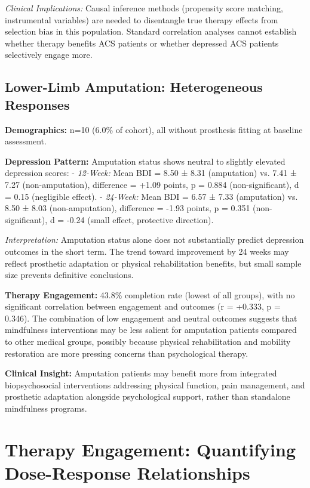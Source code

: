 \documentclass[conference]{IEEEtran}
\begin{document}
\textit{Clinical Implications:} Causal inference methods (propensity score matching, instrumental variables) are needed to disentangle true therapy effects from selection bias in this population. Standard correlation analyses cannot establish whether therapy benefits ACS patients or whether depressed ACS patients selectively engage more.

\subsection{Lower-Limb Amputation: Heterogeneous Responses}

\textbf{Demographics:} n=10 (6.0\% of cohort), all without prosthesis fitting at baseline assessment.

\textbf{Depression Pattern:} Amputation status shows neutral to slightly elevated depression scores:
- \textit{12-Week:} Mean BDI = 8.50 ± 8.31 (amputation) vs. 7.41 ± 7.27 (non-amputation), difference = +1.09 points, p = 0.884 (non-significant), d = 0.15 (negligible effect).
- \textit{24-Week:} Mean BDI = 6.57 ± 7.33 (amputation) vs. 8.50 ± 8.03 (non-amputation), difference = -1.93 points, p = 0.351 (non-significant), d = -0.24 (small effect, protective direction).

\textit{Interpretation:} Amputation status alone does not substantially predict depression outcomes in the short term. The trend toward improvement by 24 weeks may reflect prosthetic adaptation or physical rehabilitation benefits, but small sample size prevents definitive conclusions.

\textbf{Therapy Engagement:} 43.8\% completion rate (lowest of all groups), with no significant correlation between engagement and outcomes (r = +0.333, p = 0.346). The combination of low engagement and neutral outcomes suggests that mindfulness interventions may be less salient for amputation patients compared to other medical groups, possibly because physical rehabilitation and mobility restoration are more pressing concerns than psychological therapy.

\textbf{Clinical Insight:} Amputation patients may benefit more from integrated biopsychosocial interventions addressing physical function, pain management, and prosthetic adaptation alongside psychological support, rather than standalone mindfulness programs.

\section{Therapy Engagement: Quantifying Dose-Response Relationships}
\end{document}
